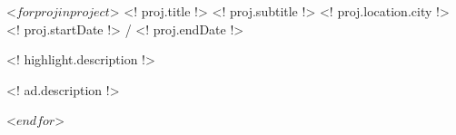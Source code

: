 \begin{cventries}
 <$ for proj in project $>
  \cventry
    {<! proj.title !>}
    {<! proj.subtitle !>}
    {<! proj.location.city !>}
    {<! proj.startDate !> / <! proj.endDate !>}
    {
          \begin{cvitems}
                \item{<! highlight.description !>}
                    \begin{cvitemssub}
                        \item{<! ad.description !>}
                    \end{cvitemssub}
          \end{cvitems}
    }
 <$ endfor $>
\end{cventries}

